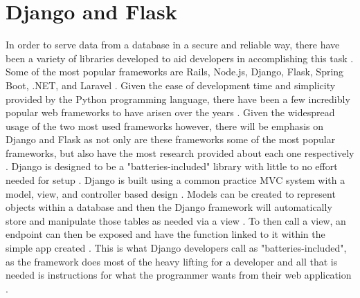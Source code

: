 \section{Django and Flask}

In order to serve data from a database in a secure and reliable way, there have been a variety of libraries developed to aid developers in accomplishing this task \cite{Chen1_Ji1_Fan1_Zhan2_2017}. Some of the most popular frameworks are Rails, Node.js, Django, Flask, Spring Boot, .NET, and Laravel \cite{Challapalli_Kaushik_Suman_Shivahare_Bibhu_Gupta_2021, Ravindran_2018, Clark}. Given the ease of development time and simplicity provided by the Python programming language, there have been a few incredibly popular web frameworks to have arisen over the years \cite{Ravindran_2018}. Given the widespread usage of the two most used frameworks however, there will be emphasis on Django and Flask as not only are these frameworks some of the most popular frameworks, but also have the most research provided about each one respectively \cite{Chou_Chen_Ding_Tu_Xu_2013}.
\newline
\newline
Django is designed to be a "batteries-included" library with little to no effort needed for setup \cite{Ravindran_2018, Challapalli_Kaushik_Suman_Shivahare_Bibhu_Gupta_2021}. Django is built using a common practice MVC system with a model, view, and controller based design \cite{Chou_Chen_Ding_Tu_Xu_2013}. Models can be created to represent objects within a database and then the Django framework will automatically store and manipulate those tables as needed via a view \cite{Ravindran_2018}. To then call a view, an endpoint can then be exposed and have the function linked to it within the simple app created \cite{Ravindran_2018}. This is what Django developers call as "batteries-included", as the framework does most of the heavy lifting for a developer and all that is needed is instructions for what the programmer wants from their web application \cite{Ravindran_2018, Challapalli_Kaushik_Suman_Shivahare_Bibhu_Gupta_2021}.
\newline
\newline
